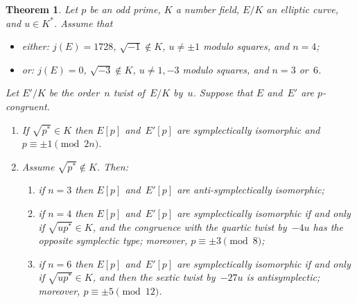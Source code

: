 \documentclass[twoside,leqno,symbols-for-thanks, draft]{rmi}
\numberwithin{equation}{section}
\newtheorem{theorem}{Theorem}[section]
\theoremstyle{remark}
\begin{document}
\begin{theorem}\label{T:typeHigher}
  Let $p$ be an odd prime, $K$ a number field, $E/K$ an elliptic
  curve, and $u\in K^*$.  Assume that
  \begin{itemize}
    \item \emph{either:} $j(E)=1728$, $\sqrt{-1}\notin K$, $u\not=\pm1$
      modulo squares, and $n=4$;
    \item \emph{or:} $j(E)=0$, $\sqrt{-3}\notin K$, $u\not=1,-3$
      modulo squares, and $n=3$ or~$6$.
  \end{itemize}

 Let $E'/K$ be the order~$n$ twist of~$E/K$ by~$u$.
 Suppose that $E$ and~$E'$ are $p$-congruent.
\begin{enumerate}
\item If $\sqrt{p^*}\in K$ then $E[p]$ and~$E'[p]$ are symplectically isomorphic
and $p\equiv\pm1\pmod{2n}$.
\item Assume $\sqrt{p^*}\notin K$. Then:
\begin{enumerate}
\item if $n=3$ then $E[p]$ and~$E'[p]$ are anti-symplectically isomorphic;
\item if $n=4$ then $E[p]$ and~$E'[p]$ are symplectically isomorphic if and only if $\sqrt{up^*}\in K$, and the congruence with the quartic twist by~$-4u$ has the opposite symplectic type; 
moreover, $p\equiv\pm3\pmod8$;
\item if $n=6$ then $E[p]$ and~$E'[p]$ are symplectically isomorphic if and only if
  $\sqrt{up^*}\in K$, and then the sextic twist by~$-27u$ is
  antisymplectic; moreover, $p\equiv\pm5\pmod{12}$.
\end{enumerate}
\end{enumerate}
\end{theorem}
\end{document}
